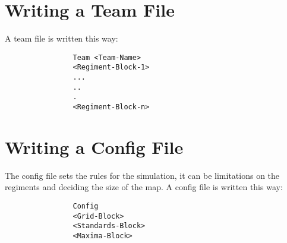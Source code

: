 \section{Writing a Team File}
		A team file is written this way: \\
			\begin{verbatim}
				Team <Team-Name>
				<Regiment-Block-1>
				...
				..
				.
				<Regiment-Block-n>
			\end{verbatim}
		
\section{Writing a Config File}
		The config file sets the rules for the simulation, it can be limitations on the regiments and deciding the size of the map.
		A config file is written this way: \\
			\begin{verbatim}
				Config
				<Grid-Block>
				<Standards-Block>
				<Maxima-Block>
			\end{verbatim}
		
